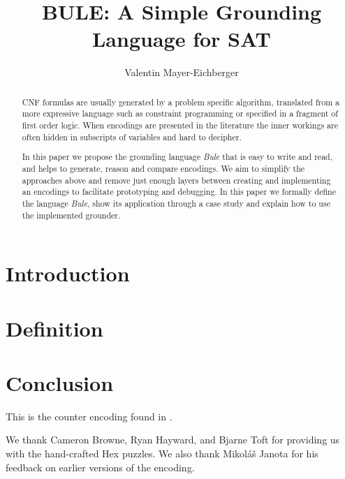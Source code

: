 \documentclass{ecai}
\begin{document}
\title{BULE: A Simple Grounding Language for SAT}
\author{Valentin Mayer-Eichberger}
\maketitle

\begin{abstract}
CNF formulas are usually generated by a problem specific algorithm, translated
    from a more expressive language such as constraint programming or specified
    in a fragment of first order logic. When encodings are  presented in the
    literature the inner workings are often hidden in subscripts of variables
    and hard to decipher.

In this paper we propose the grounding language \emph{Bule} that is easy to
    write and read, and helps to generate, reason and compare encodings. We aim
    to simplify the approaches above and remove just enough layers between
    creating and implementing an encodings to facilitate prototyping and
    debugging. In this paper we formally define the language \emph{Bule}, show
    its application through a case study and explain how to use the implemented
    grounder. 
\end{abstract}

\section{Introduction}
\section{Definition}
\section{Conclusion}

This is the counter encoding found in \cite{Sinz2005}.

We thank Cameron Browne, Ryan Hayward, and Bjarne Toft for providing us with
the hand-crafted Hex puzzles. We also thank Mikoláš Janota for his feedback on
earlier versions of the encoding.



\end{document}
